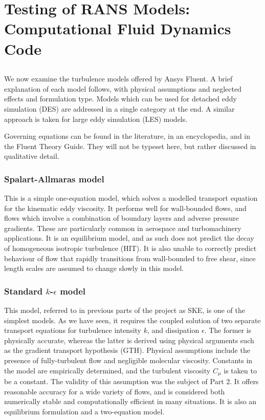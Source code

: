 \documentclass[11pt]{article}
\begin{document}
\section{Testing of RANS Models: Computational Fluid Dynamics Code}

\subsection{}

We now examine the turbulence models offered by Ansys Fluent. A brief explanation of each model follows, with physical assumptions and neglected effects and formulation type. Models which can be used for detached eddy simulation (DES) are addressed in a single category at the end. A similar approach is taken for large eddy simulation (LES) models.

Governing equations can be found in the literature, in an encyclopedia, and in the Fluent Theory Guide. They will not be typeset here, but rather discussed in qualitative detail.

\subsubsection{Spalart-Allmaras model}

This is a simple one-equation model, which solves a modelled transport equation for the kinematic eddy viscosity. It performs well for wall-bounded flows, and flows which involve a combination of boundary layers and adverse pressure gradients. These are particularly common in aerospace and turbomachinery applications. It is an equilibrium model, and as such does not predict the decay of homogeneous isotropic turbulence (HIT). It is also unable to correctly predict behaviour of flow that rapidly transitions from wall-bounded to free shear, since length scales are assumed to change slowly in this model.

\subsubsection{Standard $k$-$\epsilon$ model}

This model, referred to in previous parts of the project as SKE, is one of the simplest models. As we have seen, it requires the coupled solution of two separate transport equations for turbulence intensity $k$, and dissipation $\epsilon$. The former is physically accurate, whereas the latter is derived using physical arguments such as the gradient transport hypothesis (GTH). Physical assumptions include the presence of fully-turbulent flow and negligible molecular viscosity. Constants in the model are empirically determined, and the turbulent viscosity $C_\mu$ is taken to be a constant. The validity of this assumption was the subject of Part 2. It offers reasonable accuracy for a wide variety of flows, and is considered both numerically stable and computationally efficient in many situations. It is also an equilibrium formulation and a two-equation model.
\end{document}
